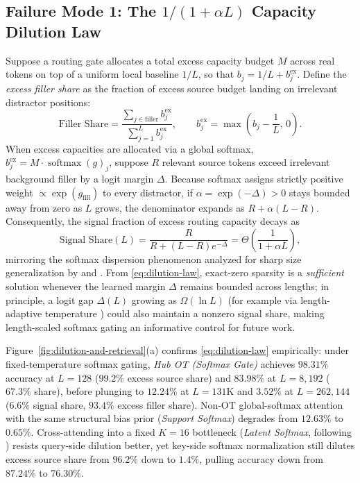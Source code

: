 \documentclass[11pt]{article}
\newcommand{\softmax}{\operatorname{softmax}}
\begin{document}
\subsection{Failure Mode 1: The \texorpdfstring{$1/(1+\alpha L)$}{1/(1 + alpha L)} Capacity Dilution Law}
\label{sec:dilution}

Suppose a routing gate allocates a total excess capacity budget $M$ across real tokens on top of a uniform local baseline $1/L$, so that $b_j = 1/L + b^{\text{ex}}_j$. Define the \emph{excess filler share} as the fraction of excess source budget landing on irrelevant distractor positions:
\begin{equation}
  \text{Filler Share} = \frac{\sum_{j \in \text{filler}} b^{\text{ex}}_j}{\sum_{j=1}^L b^{\text{ex}}_j}, \qquad b^{\text{ex}}_j = \max\!\left(b_j - \frac{1}{L},\, 0\right).
  \label{eq:filler-share}
\end{equation}
When excess capacities are allocated via a global softmax, $b^{\text{ex}}_j = M \cdot \softmax(g)_j$, suppose $R$ relevant source tokens exceed irrelevant background filler by a logit margin $\Delta$. Because softmax assigns strictly positive weight $\propto \exp(g_{\text{fill}})$ to every distractor, if $\alpha = \exp(-\Delta) > 0$ stays bounded away from zero as $L$ grows, the denominator expands as $R + \alpha(L - R)$. Consequently, the signal fraction of excess routing capacity decays as
\begin{equation}
  \text{Signal Share}(L) = \frac{R}{R + (L - R)e^{-\Delta}} = \Theta\!\left(\frac{1}{1 + \alpha L}\right),
  \label{eq:dilution-law}
\end{equation}
mirroring the softmax dispersion phenomenon analyzed for sharp size generalization by \citet{velickovic2025softmax} and \citet{vasylenko2025longcontext}. From \eqref{eq:dilution-law}, exact-zero sparsity is a \emph{sufficient} solution whenever the learned margin $\Delta$ remains bounded across lengths; in principle, a logit gap $\Delta(L)$ growing as $\Omega(\ln L)$ (for example via length-adaptive temperature \citep{velickovic2025softmax}) could also maintain a nonzero signal share, making length-scaled softmax gating an informative control for future work.

Figure~\ref{fig:dilution-and-retrieval}(a) confirms \eqref{eq:dilution-law} empirically: under fixed-temperature softmax gating, \emph{Hub OT (Softmax Gate)} achieves $98.31\%$ accuracy at $L=128$ ($99.2\%$ excess source share) and $83.98\%$ at $L=8{,}192$ ($67.3\%$ share), before plunging to $12.24\%$ at $L=131\text{K}$ and $3.52\%$ at $L=262{,}144$ ($6.6\%$ signal share, $93.4\%$ excess filler share). Non-OT global-softmax attention with the same structural bias prior (\emph{Support Softmax}) degrades from $12.63\%$ to $0.65\%$. Cross-attending into a fixed $K=16$ bottleneck (\emph{Latent Softmax}, following \citet{jaegle2021perceiver}) resists query-side dilution better, yet key-side softmax normalization still dilutes excess source share from $96.2\%$ down to $1.4\%$, pulling accuracy down from $87.24\%$ to $76.30\%$.
\end{document}

